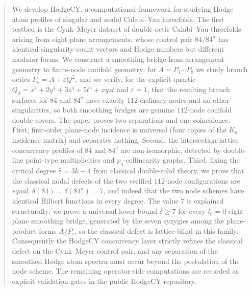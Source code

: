 \begin{abstract}
We develop HodgeCY, a computational framework for studying Hodge atom
profiles of singular and nodal Calabi--Yau threefolds. The first testbed is
the Cynk--Meyer dataset of double octic Calabi--Yau threefolds arising from
eight-plane arrangements, whose control pair $84$/$84^{a}$ has identical
singularity-count vectors and Hodge numbers but different modular forms. We
construct a smoothing bridge from arrangement geometry to finite-node
conifold geometry: for $A = P_1 \cdots P_8$ we study branch octics
$F_\varepsilon = A + \varepsilon Q^2$, and we verify, for the explicit
quartic $Q_0 = x^4 + 2y^4 + 3z^4 + 5t^4 + xyzt$ and $\varepsilon = 1$, that
the resulting branch surfaces for $84$ and $84^{a}$ have exactly $112$
ordinary nodes and no other singularities, so both smoothing bridges are
genuine $112$-node conifold double covers. The paper proves two separations
and one coincidence. First, first-order plane-node incidence is universal
(four copies of the $K_8$ incidence matrix) and separates nothing. Second,
the intersection-lattice concurrency profiles of $84$ and $84^{a}$ are
non-isomorphic, detected by double-line point-type multiplicities and
$p_4$-collinearity graphs. Third, fixing the critical degree $8 = 3k-4$
from classical double-solid theory, we prove that the classical nodal
defects of the two verified $112$-node configurations are \emph{equal},
$\delta(84) = \delta(84^{a}) = 7$, and indeed that the two node schemes have
identical Hilbert functions in every degree. The value $7$ is explained
structurally: we prove a universal lower bound $\delta \geq 7$ for every
$l_3 = 0$ eight-plane smoothing bridge, generated by the seven syzygies
among the plane-product forms $A/P_i$, so the classical defect is
lattice-blind in this family. Consequently the HodgeCY concurrency layer
strictly refines the classical defect on the Cynk--Meyer control pair, and
any separation of the smoothed Hodge atom spectra must occur beyond the
postulation of the node scheme. The remaining operator-side computations are
recorded as explicit validation gates in the public HodgeCY repository.
\end{abstract}


